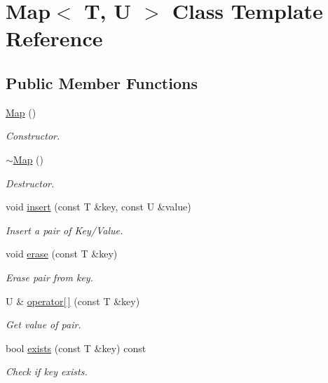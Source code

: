 \hypertarget{class_map}{\section{Map$<$ T, U $>$ Class Template Reference}
\label{class_map}
}
\subsection*{Public Member Functions}
\begin{DoxyCompactItemize}
\item 
\hypertarget{class_map_a97160ed26e941a2d3dd684e8cb1f81e1}{\hyperlink{class_map_a97160ed26e941a2d3dd684e8cb1f81e1}{Map} ()}\label{class_map_a97160ed26e941a2d3dd684e8cb1f81e1}

\begin{DoxyCompactList}\small\item\em Constructor. \end{DoxyCompactList}\item 
\hypertarget{class_map_a73313a8e61d1582204213cd171f9da7a}{\hyperlink{class_map_a73313a8e61d1582204213cd171f9da7a}{$\sim$\-Map} ()}\label{class_map_a73313a8e61d1582204213cd171f9da7a}

\begin{DoxyCompactList}\small\item\em Destructor. \end{DoxyCompactList}\item 
void \hyperlink{class_map_a28fb587fff26d7d99bb85f0c13c58a7d}{insert} (const T \&key, const U \&value)
\begin{DoxyCompactList}\small\item\em Insert a pair of Key/\-Value. \end{DoxyCompactList}\item 
void \hyperlink{class_map_a06eb6c9421ad5b67889680045850eeb5}{erase} (const T \&key)
\begin{DoxyCompactList}\small\item\em Erase pair from key. \end{DoxyCompactList}\item 
U \& \hyperlink{class_map_ab36f5b23e13763cf56b5c736486dc6f1}{operator\mbox{[}$\,$\mbox{]}} (const T \&key)
\begin{DoxyCompactList}\small\item\em Get value of pair. \end{DoxyCompactList}\item 
bool \hyperlink{class_map_ab01fe44928fff4f9078910ea60a475a4}{exists} (const T \&key) const 
\begin{DoxyCompactList}\small\item\em Check if key exists. \end{DoxyCompactList}\end{DoxyCompactItemize}


